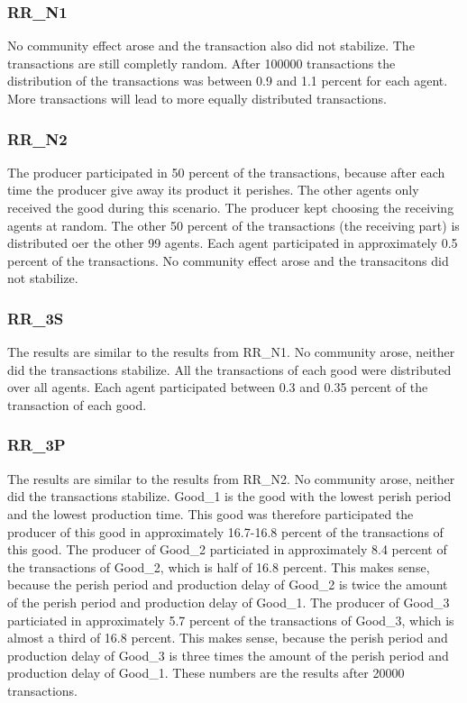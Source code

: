 \documentclass[twoside,openright]{uva-bachelor-thesis}
\begin{document}
\subsubsection{RR\_N1}
No community effect arose and the transaction also did not stabilize. The transactions are still completly random. After 100000 transactions the distribution of the transactions was between 0.9 and 1.1 percent for each agent. More transactions will lead to more equally distributed transactions.

\subsubsection{RR\_N2}
The producer participated in 50 percent of the transactions, because after each time the producer give away its product it perishes. The other agents only received the good during this scenario. The producer kept choosing the receiving agents at random. The other 50 percent of the transactions (the receiving part) is distributed oer the other 99 agents. Each agent participated in approximately 0.5 percent of the transactions. No community effect arose and the transacitons did not stabilize.

\subsubsection{RR\_3S}
The results are similar to the results from RR\_N1. No community arose, neither did the transactions stabilize. All the transactions of each good were distributed over all agents. Each agent participated between 0.3 and 0.35 percent of the transaction of each good.

\subsubsection{RR\_3P}
The results are similar to the results from RR\_N2. No community arose, neither did the transactions stabilize. Good\_1 is the good with the lowest perish period and the lowest production time. This good was therefore participated the producer of this good in approximately 16.7-16.8 percent of the transactions of this good. The producer of Good\_2 particiated in approximately 8.4 percent of the transactions of Good\_2, which is half of 16.8 percent. This makes sense, because the perish period and production delay of Good\_2 is twice the amount of the perish period and production delay of Good\_1. The producer of Good\_3 particiated in approximately 5.7 percent of the transactions of Good\_3, which is almost a third of 16.8 percent. This makes sense, because the perish period and production delay of Good\_3 is three times the amount of the perish period and production delay of Good\_1. 
These numbers are the results after 20000 transactions.
\end{document}

